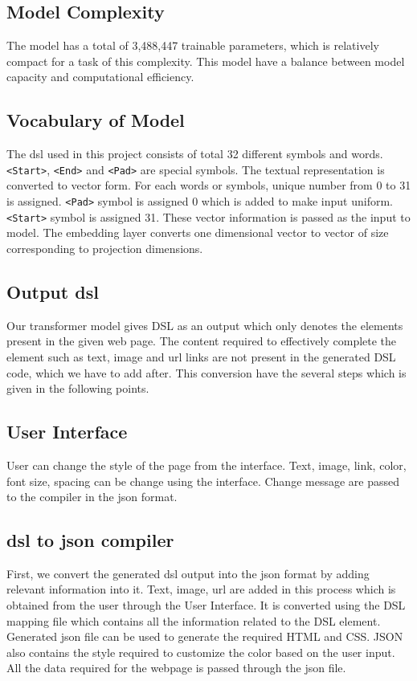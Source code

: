 \documentclass{ioereport}
\begin{document}
\subsection{Model Complexity}
The model has a total of 3,488,447 trainable parameters, which is relatively compact
for a task of this complexity. This model have a balance between model capacity and
computational efficiency.
\subsection{Vocabulary of Model}
The \gls{dsl} used in this project consists of total 32 different symbols and words. \texttt{<Start>},
\texttt{<End>} and \texttt{<Pad>} are special symbols. The textual representation is converted to vector
form. For each words or symbols, unique number from 0 to 31 is assigned. \texttt{<Pad>}
symbol is assigned 0 which is added to make input uniform. \texttt{<Start>} symbol is assigned
31. These vector information is passed as the input to model. The embedding layer
converts one dimensional vector to vector of size corresponding to projection
dimensions.
\subsection{Output \gls{dsl}}
Our transformer model gives DSL as an output which only denotes the elements present in the given 
web page. The content required to effectively complete the element such as text, image and \gls{url} 
links are not present in the generated DSL code, which we have to add after. This conversion have 
the several steps which is given in the following points. 
\subsection{User Interface}
User can change the style of the page from the interface. Text, image, link, color, font size, 
spacing can be change using the interface. Change message are passed to the compiler in the \gls{json} format. 
\subsection{\gls{dsl} to \gls{json} compiler}
First, we convert the generated \gls{dsl} output into the \gls{json} format by adding relevant information into it.
Text, image, \gls{url} are added in this process which is obtained from the user through the User Interface. It is converted
using the DSL mapping file which contains all the information related to the DSL element. Generated \gls{json} file 
can be used to generate the required HTML and CSS. JSON also contains the style required to customize the color based
 on the user input. All the data required for the webpage is passed through the \gls{json} file.
\end{document}

